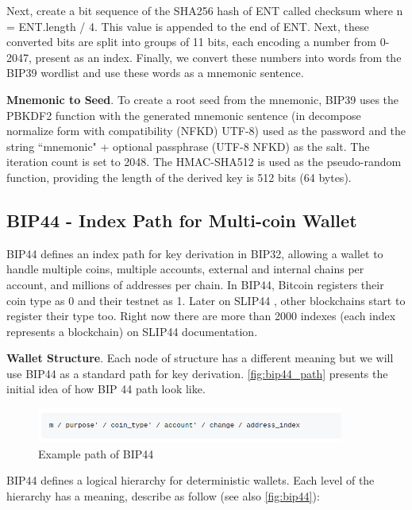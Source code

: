 Next, create a bit sequence of the SHA256 hash of ENT called checksum where n = ENT.length / 4. This value is appended to the end of ENT. Next, these converted bits are split into groups of 11 bits, each encoding a number from 0-2047, present as an index. Finally, we convert these numbers into words from the BIP39 wordlist and use these words as a mnemonic sentence.

\bigskip
{\textbf{Mnemonic to Seed}}. To create a root seed from the mnemonic, BIP39 uses the PBKDF2 function with the generated mnemonic sentence (in decompose normalize form with compatibility (NFKD) UTF-8) used as the password and the string ``mnemonic" + optional passphrase (UTF-8 NFKD) as the salt. The iteration count is set to 2048. The HMAC-SHA512 is used as the pseudo-random function, providing the length of the derived key is 512 bits (64 bytes).


\subsection{BIP44 - Index Path for Multi-coin Wallet}
BIP44 \cite{bip44} defines an index path for key derivation in BIP32, allowing a wallet to handle multiple coins, multiple accounts, external and internal chains per account, and millions of addresses per chain. In BIP44, Bitcoin registers their coin type as 0 and their testnet as 1. Later on SLIP44 \cite{slip44}, other blockchains start to register their type too. Right now there are more than 2000 indexes (each index represents a blockchain) on SLIP44 documentation.

\bigskip
{\textbf{Wallet Structure}}. Each node of structure has a different meaning but we will use BIP44 as a standard path for key derivation. \autoref{fig:bip44_path} presents the initial idea of how BIP 44 path look like.

\begin{figure}[ht!]
    \centering
    \includegraphics[width=0.9\textwidth]{images/bip44_path.png}
    \caption[Example path of BIP44]{Example path of BIP44}
    \label{fig:bip44_path}
\end{figure}

BIP44 defines a logical hierarchy for deterministic wallets. Each level of the hierarchy has a meaning, describe as follow (see also \autoref{fig:bip44}):

